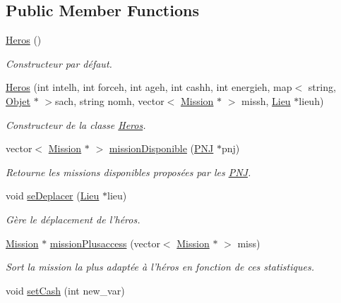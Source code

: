\subsection*{Public Member Functions}
\begin{DoxyCompactItemize}
\item 
\hyperlink{class_heros_ab4c8bc5b87a080c5f609a65bfab62c48}{Heros} ()
\begin{DoxyCompactList}\small\item\em Constructeur par défaut. \end{DoxyCompactList}\item 
\hyperlink{class_heros_a81e1ae1248debd353171ce44d910258d}{Heros} (int intelh, int forceh, int ageh, int cashh, int energieh, map$<$ string, \hyperlink{class_objet}{Objet} $\ast$ $>$sach, string nomh, vector$<$ \hyperlink{class_mission}{Mission} $\ast$ $>$ missh, \hyperlink{class_lieu}{Lieu} $\ast$lieuh)
\begin{DoxyCompactList}\small\item\em Constructeur de la classe \hyperlink{class_heros}{Heros}. \end{DoxyCompactList}\item 
vector$<$ \hyperlink{class_mission}{Mission} $\ast$ $>$ \hyperlink{class_heros_a38a959dcbaf42360236c0bb796ed7dcd}{mission\-Disponible} (\hyperlink{class_p_n_j}{P\-N\-J} $\ast$pnj)
\begin{DoxyCompactList}\small\item\em Retourne les missions disponibles proposées par les \hyperlink{class_p_n_j}{P\-N\-J}. \end{DoxyCompactList}\item 
void \hyperlink{class_heros_a88e91d926762f89d14b1bbc11ff4ae82}{se\-Deplacer} (\hyperlink{class_lieu}{Lieu} $\ast$lieu)
\begin{DoxyCompactList}\small\item\em Gère le déplacement de l'héros. \end{DoxyCompactList}\item 
\hyperlink{class_mission}{Mission} $\ast$ \hyperlink{class_heros_a11ebaa337de66722218930064505ce3c}{mission\-Plusaccess} (vector$<$ \hyperlink{class_mission}{Mission} $\ast$ $>$ miss)
\begin{DoxyCompactList}\small\item\em Sort la mission la plus adaptée à l'héros en fonction de ces statistiques. \end{DoxyCompactList}\item 
void \hyperlink{class_heros_ae87dba7afa03e7fdacfc3a7e82d3a6a3}{set\-Cash} (int new\-\_\-var)

\end{DoxyCompactItemize}
